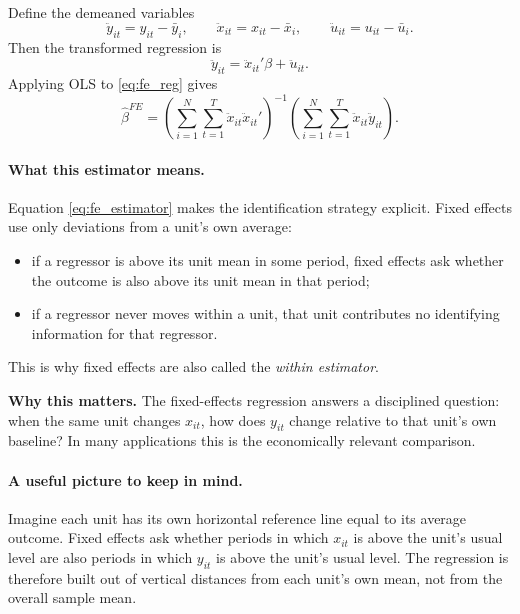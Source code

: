 Define the demeaned variables
\[
\ddot{y}_{it} = y_{it}-\bar{y}_i,
\qquad
\ddot{x}_{it} = x_{it}-\bar{x}_i,
\qquad
\ddot{u}_{it} = u_{it}-\bar{u}_i.
\]
Then the transformed regression is
\begin{equation}
\ddot{y}_{it} = \ddot{x}_{it}'\beta + \ddot{u}_{it}.
\label{eq:fe_reg}
\end{equation}
Applying \ac{OLS} to \eqref{eq:fe_reg} gives
\begin{equation}
\hat{\beta}^{FE}
=
\left(\sum_{i=1}^N \sum_{t=1}^T \ddot{x}_{it}\ddot{x}_{it}'\right)^{-1}
\left(\sum_{i=1}^N \sum_{t=1}^T \ddot{x}_{it}\ddot{y}_{it}\right).
\label{eq:fe_estimator}
\end{equation}

\paragraph{What this estimator means.}
Equation \eqref{eq:fe_estimator} makes the identification strategy explicit. Fixed effects use only deviations from a unit's own average:
\begin{itemize}
\item if a regressor is above its unit mean in some period, fixed effects ask whether the outcome is also above its unit mean in that period;
\item if a regressor never moves within a unit, that unit contributes no identifying information for that regressor.
\end{itemize}
This is why fixed effects are also called the \emph{within estimator}.

\begin{boxD}
\textbf{Why this matters.}
The fixed-effects regression answers a disciplined question: when the same unit changes $x_{it}$, how does $y_{it}$ change relative to that unit's own baseline? In many applications this is the economically relevant comparison.
\end{boxD}

\paragraph{A useful picture to keep in mind.}
Imagine each unit has its own horizontal reference line equal to its average outcome. Fixed effects ask whether periods in which $x_{it}$ is above the unit's usual level are also periods in which $y_{it}$ is above the unit's usual level. The regression is therefore built out of vertical distances from each unit's own mean, not from the overall sample mean.

